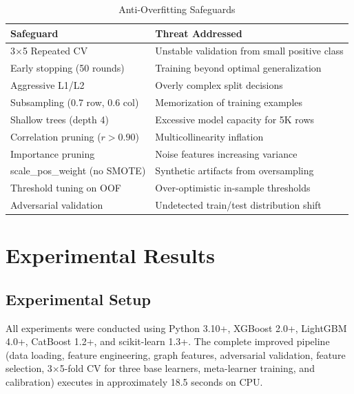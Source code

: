 \documentclass[conference]{IEEEtran}
\begin{document}
\begin{table}[t]
\caption{Anti-Overfitting Safeguards}
\label{tab:safeguards}
\centering
\small
\begin{tabular}{@{}p{2.8cm}p{4.8cm}@{}}
\toprule
\textbf{Safeguard} & \textbf{Threat Addressed} \\
\midrule
3$\times$5 Repeated CV & Unstable validation from small positive class \\
Early stopping (50 rounds) & Training beyond optimal generalization \\
Aggressive L1/L2 & Overly complex split decisions \\
Subsampling (0.7 row, 0.6 col) & Memorization of training examples \\
Shallow trees (depth 4) & Excessive model capacity for 5K rows \\
Correlation pruning ($r > 0.90$) & Multicollinearity inflation \\
Importance pruning & Noise features increasing variance \\
scale\_pos\_weight (no SMOTE) & Synthetic artifacts from oversampling \\
Threshold tuning on OOF & Over-optimistic in-sample thresholds \\
Adversarial validation & Undetected train/test distribution shift \\
\bottomrule
\end{tabular}
\vspace{-2mm}
\end{table}

\section{Experimental Results}
\label{sec:results}

\subsection{Experimental Setup}

All experiments were conducted using Python 3.10+, XGBoost 2.0+, LightGBM 4.0+, CatBoost 1.2+, and scikit-learn 1.3+. The complete improved pipeline (data loading, feature engineering, graph features, adversarial validation, feature selection, 3$\times$5-fold CV for three base learners, meta-learner training, and calibration) executes in approximately 18.5 seconds on CPU.
\end{document}
